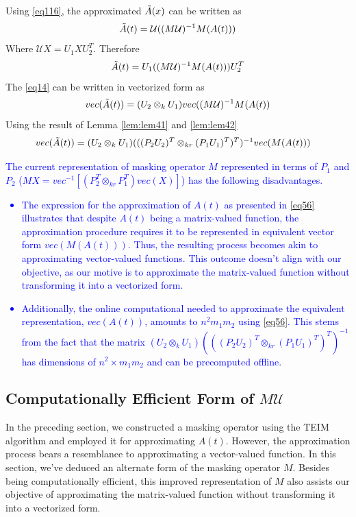 \documentclass{article}
\begin{document}
Using \eqref{eq116}, the approximated $\Tilde{A}(x)$ can be written as 
\begin{equation*}
     \Tilde{A}(t) = \mathcal{U}((M\mathcal{U})^{-1}M(A(t)))
  \end{equation*}
   Where $\mathcal{U}X = U_1XU_2^T$. Therefore 
  \begin{equation}\label{eq14} 
     \Tilde{A}(t) = U_1((M\mathcal{U})^{-1}M(A(t)))U_2^T
  \end{equation} 
The \eqref{eq14} can be written in vectorized form as
\begin{equation*}
    vec(\Tilde{A}(t))= (U_2 \otimes_k U_1)vec((M\mathcal{U})^{-1}M(A(t))
\end{equation*}
Using the result of Lemma \ref{lem:lem41} and \ref{lem:lem42}
\begin{equation}\label{eq56}
\begin{split}
     vec(\Tilde{A}(t))&= (U_2 \otimes_k U_1)(((P_2U_2)^T\otimes _{kr}(P_1U_1)^T)^T)^{-1}vec(M(A(t)))
\end{split}
\end{equation}

\textcolor{blue}{The current representation of masking operator $M$ represented in terms of $P_1$ and $P_2$ ($MX=vec^{-1} \left[(P_2^T \otimes_{kr} P_1^T)vec(X)\right]$) has the following disadvantages.
\begin{itemize}
    \item The expression for the approximation of $A(t)$ as presented in \eqref{eq56} illustrates that despite $A(t)$ being a matrix-valued function, the approximation procedure requires it to be represented in equivalent vector form $vec(M(A(t)))$. Thus, the resulting process becomes akin to approximating vector-valued functions. This outcome doesn't align with our objective, as our motive is to approximate the matrix-valued function without transforming it into a vectorized form.
    \item Additionally, the online computational needed to approximate the equivalent representation, $vec(A(t))$, amounts to $n^2m_1m_2$ using \eqref{eq56}. This stems from the fact that the matrix $(U_2 \otimes_k U_1)(((P_2U_2)^T\otimes _{kr}(P_1U_1)^T)^T)^{-1}$ has dimensions of $n^2 \times m_1m_2$ and can be precomputed offline.
\end{itemize}}
\subsection{Computationally Efficient Form of $M\mathcal{U}$} In the preceding section, we constructed a masking operator using the TEIM algorithm and employed it for approximating $A(t)$. However, the approximation process bears a resemblance to approximating a vector-valued function. In this section, we've deduced an alternate form of the masking operator $M$. Besides being computationally efficient, this improved representation of $M$ also assists our objective of approximating the matrix-valued function without transforming it into a vectorized form.
\end{document}
